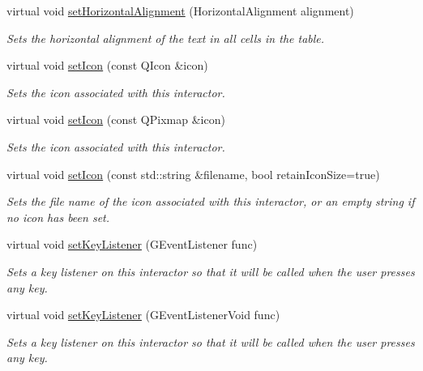 \begin{DoxyCompactItemize}
virtual void \mbox{\hyperlink{classGTable_a04e6ce745dd0f9708f14dedc68ec8b18}{set\+Horizontal\+Alignment}} (Horizontal\+Alignment alignment)
\begin{DoxyCompactList}\small\item\em Sets the horizontal alignment of the text in all cells in the table. \end{DoxyCompactList}\item 
virtual void \mbox{\hyperlink{classGInteractor_a542abfcd7261751352af129c7215ecda}{set\+Icon}} (const Q\+Icon \&icon)
\begin{DoxyCompactList}\small\item\em Sets the icon associated with this interactor. \end{DoxyCompactList}\item 
virtual void \mbox{\hyperlink{classGInteractor_a368e1a338f84401c284506d03b1ba769}{set\+Icon}} (const Q\+Pixmap \&icon)
\begin{DoxyCompactList}\small\item\em Sets the icon associated with this interactor. \end{DoxyCompactList}\item 
virtual void \mbox{\hyperlink{classGInteractor_a762e139aa311461c3984d3ad28293f64}{set\+Icon}} (const std\+::string \&filename, bool retain\+Icon\+Size=true)
\begin{DoxyCompactList}\small\item\em Sets the file name of the icon associated with this interactor, or an empty string if no icon has been set. \end{DoxyCompactList}\item 
virtual void \mbox{\hyperlink{classGInteractor_aeb8324d3287fa1fbe093f4d6230cf0a6}{set\+Key\+Listener}} (G\+Event\+Listener func)
\begin{DoxyCompactList}\small\item\em Sets a key listener on this interactor so that it will be called when the user presses any key. \end{DoxyCompactList}\item 
virtual void \mbox{\hyperlink{classGInteractor_ae48ecea73606c7bd9423e1c7cc589cc9}{set\+Key\+Listener}} (G\+Event\+Listener\+Void func)
\begin{DoxyCompactList}\small\item\em Sets a key listener on this interactor so that it will be called when the user presses any key. \end{DoxyCompactList}\item 

\end{DoxyCompactItemize}
